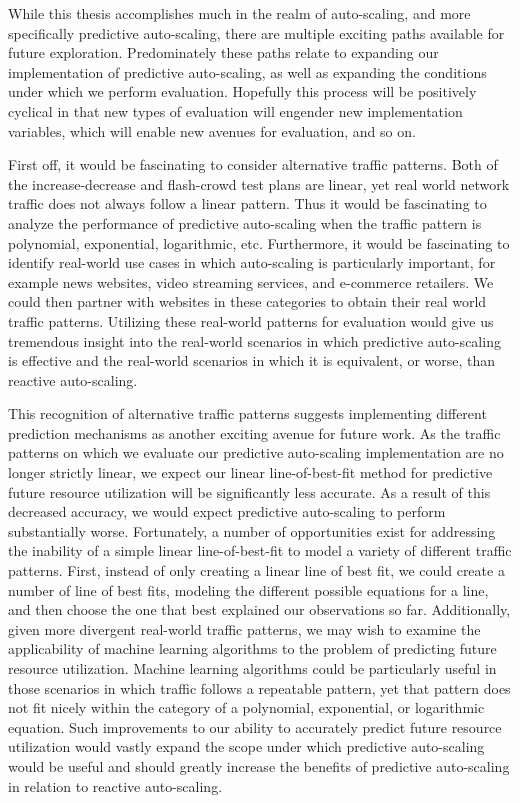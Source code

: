 While this thesis accomplishes much in the realm of auto-scaling, and more
specifically predictive auto-scaling, there are multiple exciting paths
available for future exploration. Predominately these paths relate to expanding
our implementation of predictive auto-scaling, as well as expanding the
conditions under which we perform evaluation. Hopefully this process will be
positively cyclical in that new types of evaluation will engender new
implementation variables, which will enable new avenues for evaluation, and so
on.

First off, it would be fascinating to consider alternative traffic patterns.
Both of the increase-decrease and flash-crowd test plans are linear, yet real
world network traffic does not always follow a linear pattern. Thus it would be
fascinating to analyze the performance of predictive auto-scaling when the
traffic pattern is polynomial, exponential, logarithmic, etc. Furthermore, it
would be fascinating to identify real-world use cases in which auto-scaling is
particularly important, for example news websites, video streaming services, and
e-commerce retailers. We could then partner with websites in these categories to
obtain their real world traffic patterns. Utilizing these real-world patterns
for evaluation
would give us tremendous insight into the real-world scenarios in which
predictive auto-scaling is effective and the real-world scenarios in which it is
equivalent, or worse, than reactive auto-scaling.

This recognition of alternative traffic patterns suggests implementing
different prediction mechanisms as another exciting avenue for future work. As
the traffic patterns on which we evaluate our predictive auto-scaling
implementation are no longer strictly linear, we expect our linear
line-of-best-fit method for predictive future resource utilization will be
significantly less accurate. As a result of this decreased accuracy, we would
expect predictive auto-scaling to perform substantially worse. Fortunately, a
number of opportunities exist for addressing the inability of a simple linear
line-of-best-fit to model a variety of different traffic patterns.
First, instead of only creating a linear line of best fit, we could
create a number of line of best fits, modeling the different possible equations
for a line, and then choose the one that best explained our observations so far.
Additionally, given more divergent real-world traffic patterns, we may wish to
examine the applicability of machine learning algorithms to the problem of
predicting future resource utilization. Machine learning algorithms could be
particularly useful in those scenarios in which traffic follows a repeatable
pattern, yet that pattern does not fit nicely within the category of a
polynomial, exponential, or logarithmic equation. Such improvements to our
ability to accurately predict future resource utilization
would vastly expand the scope under which predictive auto-scaling would be
useful and should greatly increase the benefits of predictive auto-scaling in
relation to reactive auto-scaling.

